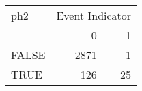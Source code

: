 \begin{tabular}{lrr}
   \hline
  ph2&  \multicolumn{2}{c}{Event Indicator}   \\  
&0& 1\\ 
\hline
FALSE & 2871 & 1 \\ 
  TRUE & 126 & 25 \\ 
   \hline
\end{tabular}
